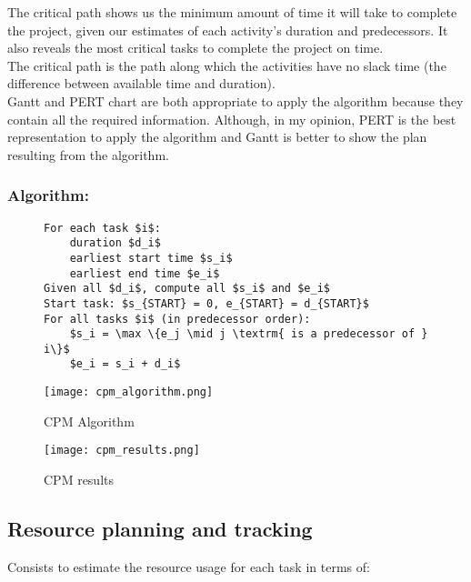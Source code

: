 The critical path shows us the minimum amount of time it will take to complete the project,
given our estimates of each activity’s duration and predecessors. It also reveals the most critical tasks to complete the project on time.\\

The critical path is the path along which the activities have no slack time (the difference between available time and duration).\\

Gantt and PERT chart are both appropriate to apply the algorithm because they contain all the
required information. Although, in my opinion, PERT is the best representation to apply the
algorithm and Gantt is better to show the plan resulting from the algorithm.

\subsubsection{Algorithm:}

\begin{figure}[!ht]
\begin{minipage}{\linewidth}
    \begin{minipage}[t]{0.6\linewidth}
        \begin{lstlisting}[mathescape]
For each task $i$:
    duration $d_i$
    earliest start time $s_i$
    earliest end time $e_i$
Given all $d_i$, compute all $s_i$ and $e_i$
Start task: $s_{START} = 0, e_{START} = d_{START}$
For all tasks $i$ (in predecessor order):
    $s_i = \max \{e_j \mid j \textrm{ is a predecessor of } i\}$
    $e_i = s_i + d_i$
        \end{lstlisting}
    \end{minipage}
    \begin{minipage}{0.35\linewidth}
        \texttt{[image: cpm\_algorithm.png]}
        \caption{CPM Algorithm}
    \end{minipage}
\end{minipage}
    \centering
    \texttt{[image: cpm\_results.png]}
    \caption{CPM results}
\end{figure}
\FloatBarrier{}

\subsection{Resource planning and tracking}

Consists to estimate the resource usage for each task in terms of:

